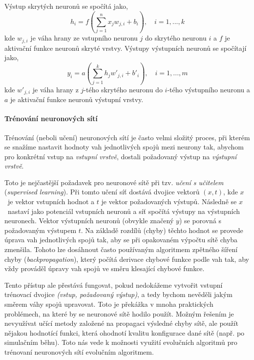 Výstup skrytých neuronů se spočítá jako,
\begin{equation} \label{eq:hidden}
    h_i = f(\sum_{j=1}^{n} x_j w_{j,i} + b_i), \quad i = 1,...,k
\end{equation}
kde $w_{j,i}$ je váha hrany ze vstupního neuronu $j$ do skrytého neuronu $i$ a
$f$ je aktivační funkce neuronů skryté vrstvy.
Výstupy výstupních neuronů se spočítají jako,
\begin{equation} \label{eq:output}
    y_i = a(\sum_{j=1}^{k} h_j w'_{j,i} + b'_i), \quad i = 1,...,m
\end{equation}
kde $w'_{j,i}$ je váha hrany z $j$-tého skrytého neuronu do $i$-tého výstupního
neuronu a $a$ je aktivační funkce neuronů výstupní vrstvy.

\paragraph{Trénování neuronových sítí}
Trénování (neboli učení) neuronových sítí je často velmi složitý proces, při
kterém se snažíme nastavit hodnoty vah jednotlivých spojů mezi neurony tak,
abychom pro konkrétní vstup na \emph{vstupní vrstvě}, dostali požadovaný výstup
na \emph{výstupní vrstvě}. 

Toto je nejčastější požadavek pro neuronové sítě při tzv. \emph{učení s
učitelem} (\emph{supervised learning}). Při tomto učení síť dostává dvojice
vektorů $(x, t)$, kde $x$~je vektor vstupních hodnot a $t$ je vektor
požadovaných výstupů. Následně se $x$~nastaví jako potenciál vstupních neuronů
a síť spočítá výstupy na výstupních neuronech. Vektor výstupních neuronů
(obvykle značený $y$) se porovná s požadovaným výstupem $t$. Na základě rozdílů
(chyby) těchto hodnot se provede úprava vah jednotlivých spojů tak, aby se při
opakovaném výpočtu sítě chyba zmenšila. Tohoto lze dosáhnout často používaným
algoritmem zpětného šíření chyby (\emph{backpropagation}), který počítá
derivace chybové funkce podle vah tak, aby vždy prováděl úpravy vah spojů ve
směru klesající chybové funkce.

Tento přístup ale přestává fungovat, pokud nedokážeme vytvořit vstupní
trénovací dvojice \emph{(vstup, požadovaný výstup)}, a tedy bychom nevěděli jakým
směrem váhy spojů upravovat. Toto je překážka v mnoha praktických problémech,
na které by se neuronové sítě hodilo použít. Možným řešením je nevyužívat učící
metody založené na propagaci výsledné chyby sítě, ale použít nějakou hodnotící
funkci, která ohodnotí kvalitu konfigurace dané sítě (např. po simulačním
běhu). Toto nás vede k možnosti využití evolučních algoritmů pro trénovaní
neuronových sítí evolučním algoritmem.

